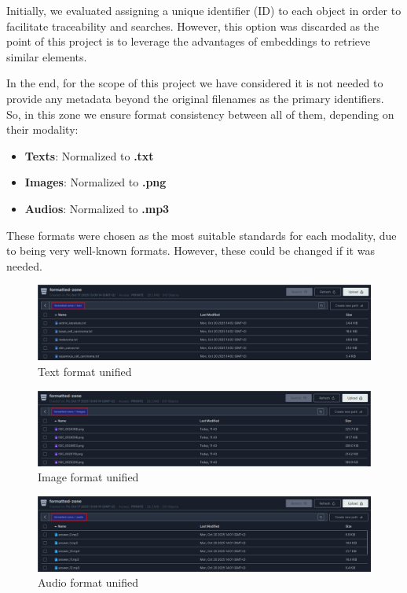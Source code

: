 \documentclass[12pt]{article}
\begin{document}
Initially, we evaluated assigning a unique identifier (ID) to each object in order to facilitate traceability and searches. However, this option was discarded as the point of this project is to leverage the advantages of embeddings to retrieve similar elements.

In the end, for the scope of this project we have considered it is not needed to provide any metadata beyond the original filenames as the primary identifiers. So, in this zone we ensure format consistency between all of them, depending on their modality:
\begin{itemize}
    \item \textbf{Texts}: Normalized to \textbf{.txt}
    \item \textbf{Images}: Normalized to \textbf{.png}
    \item \textbf{Audios}: Normalized to \textbf{.mp3}
\end{itemize}

These formats were chosen as the most suitable standards for each modality, due to being very well-known formats. However, these could be changed if it was needed.

\begin{figure}[H]
    \centering
    \includegraphics[width=1\linewidth]{images/formatted-text.png}
    \caption{Text format unified}
    \label{fig:placeholder}
\end{figure}

\begin{figure}[H]
    \centering
    \includegraphics[width=1\linewidth]{images/formatted-images.png}
    \caption{Image format unified}
    \label{fig:image}
\end{figure}

\begin{figure}[H]
    \centering
    \includegraphics[width=1\linewidth]{images/formatted-audio.png}
    \caption{Audio format unified}
    \label{fig:placeholder}
\end{figure}
\end{document}
